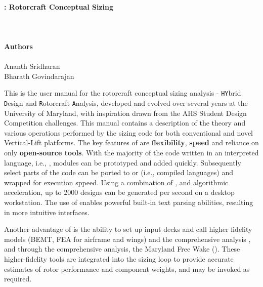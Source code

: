
\thispagestyle{empty}
\hbox{\ }
\vspace{1in}
\renewcommand{\baselinestretch}{1}
\small\normalsize
\begin{center}
\large{\textbf{\hydra: Rotorcraft Conceptual Sizing}}\\
\ \\
\large{ }
\ \\
\ \\
\textbf{Authors}
\ \\
\ \\
Ananth Sridharan \\
Bharath Govindarajan \\
\end{center}
\noindent
This is the user manual for the rotorcraft conceptual sizing  analysis \textbf{\hydra} - \texttt{HY}brid \texttt{D}esign and \texttt{R}otorcraft \texttt{A}nalysis, developed and evolved over several years at the University of Maryland, with inspiration  drawn from the AHS Student Design Competition challenges. This manual contains a description of the theory and various operations performed by the sizing code for both conventional and novel Vertical-Lift platforms.
\vspace{0.5cm}
The key features of \hydra \spc are \textbf{flexibility}, \textbf{speed} and reliance on only \textbf{open-source tools}. With the majority of the code written in an interpreted language, i.e., \python, modules can be prototyped and added quickly. Subsequently select parts of the code can be ported to  or  (i.e., compiled languages) and wrapped for execution sppeed. Using a combination of ,  and algorithmic acceleration, up to 2000 designs can be generated per second on a desktop workstation. The use of \python enables powerful built-in text parsing abilities, resulting in more intuitive interfaces. 
\vspace{0.5cm}

\noindent Another advantage of \hydra \spc is the ability to set up input decks and call higher fidelity models (BEMT, FEA for airframe and wings) and the comprehensive analysis , and through the comprehensive analysis, the Maryland Free Wake (). These higher-fidelity tools are integrated into the sizing loop to provide accurate estimates of rotor performance and component weights, and may be invoked as required.
\vspace{0.5cm} 